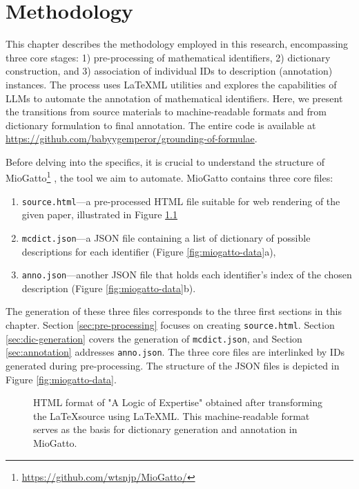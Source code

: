 \chapter{Methodology}\label{chapter:methods}

This chapter describes the methodology employed in this research, encompassing three core stages: 1) pre-processing of mathematical identifiers, 2) dictionary construction, and 3) association of individual IDs to description (annotation) instances. The process uses \LaTeX ML utilities and explores the capabilities of \ac{LLMs} to automate the annotation of mathematical identifiers. Here, we present the transitions from source materials to machine-readable formats and from dictionary formulation to final annotation. The entire code is available at \url{https://github.com/babyygemperor/grounding-of-formulae}.

Before delving into the specifics, it is crucial to understand the structure of \\ MioGatto\footnote{\url{https://github.com/wtsnjp/MioGatto/}} \citep{asakura2021miogatto}, the tool we aim to automate. MioGatto contains three core files: 
\begin{enumerate}
    \item \texttt{source.html}—a pre-processed HTML file suitable for web rendering of the given paper, illustrated in Figure \ref{fig:miogatto-sources}
    \item \texttt{mcdict.json}—a JSON file containing a list of dictionary of possible descriptions for each identifier (Figure \ref{fig:miogatto-data}a), 
    \item \texttt{anno.json}—another JSON file that holds each identifier's index of the chosen description (Figure \ref{fig:miogatto-data}b).
\end{enumerate}

The generation of these three files corresponds to the three first sections in this chapter. 
Section \ref{sec:pre-processing} focuses on creating \texttt{source.html}. 
Section \ref{sec:dic-generation} covers the generation of \texttt{mcdict.json}, and Section \ref{sec:annotation} addresses \texttt{anno.json}. The three core files are interlinked by IDs generated during pre-processing. The structure of the JSON files is depicted in Figure \ref{fig:miogatto-data}.

\begin{figure}[htpb]
  \centering
    \begin{minipage}{1\textwidth}
      
    \end{minipage}
  \caption[LaTeXML Pre-processing]{HTML format of "A Logic of Expertise" \citep{singleton2021logic} obtained after transforming the \LaTeX \space source using \LaTeX ML. This machine-readable format serves as the basis for dictionary generation and annotation in MioGatto.}\label{fig:miogatto-sources}
\end{figure}

